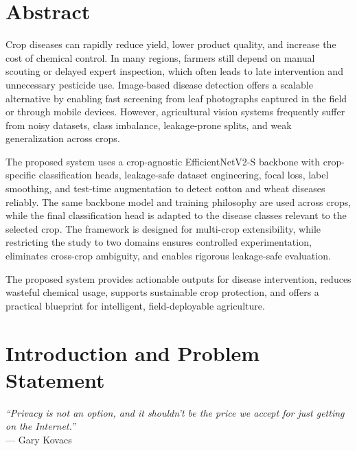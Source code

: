 \documentclass[12pt,a4paper]{report}
\begin{document}
 
\newpage
 
 \chapter*{Abstract}
Crop diseases can rapidly reduce yield, lower product quality, and increase the cost of chemical control. In many regions, farmers still depend on manual scouting or delayed expert inspection, which often leads to late intervention and unnecessary pesticide use. Image-based disease detection offers a scalable alternative by enabling fast screening from leaf photographs captured in the field or through mobile devices. However, agricultural vision systems frequently suffer from noisy datasets, class imbalance, leakage-prone splits, and weak generalization across crops.

The proposed system uses a crop-agnostic EfficientNetV2-S backbone with crop-specific classification heads, leakage-safe dataset engineering, focal loss, label smoothing, and test-time augmentation to detect cotton and wheat diseases reliably. The same backbone model and training philosophy are used across crops, while the final classification head is adapted to the disease classes relevant to the selected crop. The framework is designed for multi-crop extensibility, while restricting the study to two domains ensures controlled experimentation, eliminates cross-crop ambiguity, and enables rigorous leakage-safe evaluation.

The proposed system provides actionable outputs for disease intervention, reduces wasteful chemical usage, supports sustainable crop protection, and offers a practical blueprint for intelligent, field-deployable agriculture.
 
\setcounter{tocdepth}{1} 
 \tableofcontents
 \thispagestyle{plain}
 
 \listoffigures
{}
\listoftables
{}
 \newpage

 \chapter{Introduction and Problem Statement}

\begin{flushright}
\textit{“Privacy is not an option, and it shouldn't be the price we accept for just getting on the Internet.”}\\
— Gary Kovacs
\end{flushright}
\end{document}
